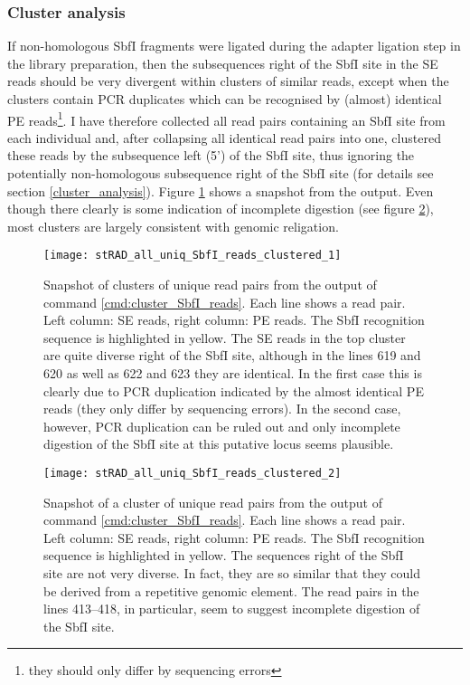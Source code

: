 \documentclass[a4paper,12pt,times,authoryear,twoside,print,index]{Classes/PhDThesisPSnPDF}\usepackage[]{graphicx}\usepackage[]{color}
\begin{document}
\subsubsection{Cluster analysis}

If non-homologous SbfI fragments were ligated during the adapter ligation step in the library preparation, then the subsequences right of the SbfI site in the SE reads should be very divergent within clusters of similar reads, except when the clusters contain PCR duplicates which can be recognised by (almost) identical PE reads\footnote{they should only differ by sequencing errors}. I have therefore collected all read pairs containing an SbfI site from each individual and, after collapsing all identical read pairs into one, clustered these reads by the subsequence left (5') of the SbfI site, thus ignoring the potentially non-homologous subsequence right of the SbfI site (for details see section \ref{cluster_analysis}). Figure \ref{stRAD_all_uniq_SbfI_reads_clustered_1} shows a snapshot from the output.  Even though there clearly is some indication of incomplete digestion (see figure \ref{stRAD_all_uniq_SbfI_reads_clustered_2}), most clusters are largely consistent with genomic religation.
%
\begin{figure}
\centering
\texttt{[image: stRAD\_all\_uniq\_SbfI\_reads\_clustered\_1]}
\caption{Snapshot of clusters of unique read pairs from the output of command \ref{cmd:cluster_SbfI_reads}. Each line shows a read pair. Left column: SE reads, right column: PE reads. The SbfI recognition sequence is highlighted in yellow. The SE reads in the top cluster are quite diverse right of the SbfI site, although in the lines 619 and 620 as well as 622 and 623 they are identical. In the first case this is clearly due to PCR duplication indicated by the almost identical PE reads (they only differ by sequencing errors). In the second case, however, PCR duplication can be ruled out and only incomplete digestion of the SbfI site at this putative locus seems plausible.}
\label{stRAD_all_uniq_SbfI_reads_clustered_1}
\end{figure}
%
\begin{figure}
\centering
\texttt{[image: stRAD\_all\_uniq\_SbfI\_reads\_clustered\_2]}
\caption{Snapshot of a cluster of unique read pairs from the output of command \ref{cmd:cluster_SbfI_reads}. Each line shows a read pair. Left column: SE reads, right column: PE reads. The SbfI recognition sequence is highlighted in yellow. The sequences right of the SbfI site are not very diverse. In fact, they are so similar that they could be derived from a repetitive genomic element. The read pairs in the lines 413--418, in particular, seem to suggest incomplete digestion of the SbfI site.}
\label{stRAD_all_uniq_SbfI_reads_clustered_2}
\end{figure}
\end{document}
